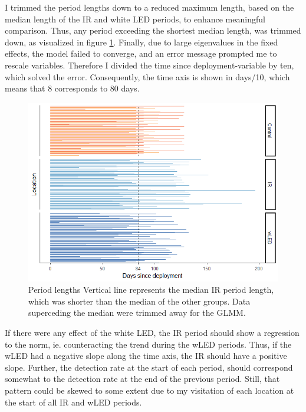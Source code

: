 I trimmed the period lengths down to a reduced maximum length, based on the median length of the IR and white LED periods, to enhance meaningful comparison.
Thus, any period exceeding the shortest median length, was trimmed down, as visualized in figure \ref{fig:median_period}.
Finally, due to large eigenvalues in the fixed effects, the model failed to converge, and an error message prompted me to rescale variables.
Therefore I divided the time since deployment-variable by ten, which solved the error. Consequently, the time axis is shown in days/10, which means that 8 corresponds to 80 days.


\begin{figure}
	\centering
	\includegraphics[scale=.8]{../R/glmm_sp_files/figure-html/period-length-wControl-1.png}
	\caption[Period lengths]
	{Period lengths %
	Vertical line represents the median IR period length, which was shorter than the median of the other groups. Data superceding the median were trimmed away for the GLMM. \label{fig:median_period}}
\end{figure}

If there were any effect of the white LED, the IR period should show a regression to the norm, ie. counteracting the trend during the wLED periods. Thus, if the wLED had a negative slope along the time axis, the IR should have a positive slope.
Further, the detection rate at the start of each period, should correspond somewhat to the detection rate at the end of the previous period. Still, that pattern could be skewed to some extent due to my visitation of each location at the start of all IR and wLED periods.







